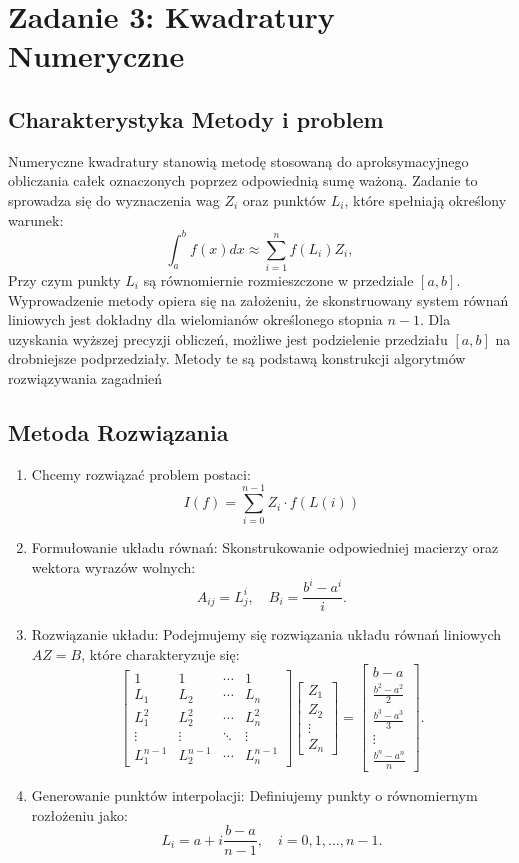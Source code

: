 \section{Zadanie 3: Kwadratury Numeryczne}
\subsection{Charakterystyka Metody i problem} 
Numeryczne kwadratury stanowią metodę stosowaną do aproksymacyjnego obliczania całek oznaczonych poprzez odpowiednią sumę ważoną. Zadanie to sprowadza się do wyznaczenia wag \( Z_i \) oraz punktów \( L_i \), które spełniają określony warunek:
\[
\int_a^b f(x)dx \approx \sum_{i=1}^n f(L_i)Z_i,
\]
Przy czym punkty \( L_i \) są równomiernie rozmieszczone w przedziale \([a, b]\). Wyprowadzenie metody opiera się na założeniu, że skonstruowany system równań liniowych jest dokładny dla wielomianów określonego stopnia \( n-1 \). Dla uzyskania wyższej precyzji obliczeń, możliwe jest podzielenie przedziału \([a, b]\) na drobniejsze podprzedziały. Metody te są podstawą konstrukcji algorytmów rozwiązywania zagadnień 

\subsection{Metoda Rozwiązania} 
\begin{enumerate}

\item Chcemy rozwiązać problem postaci:
\[
    I(f) = \sum_{i = 0}^{n-1} Z_i \cdot f(L(i))  
\]
\item Formułowanie układu równań: Skonstrukowanie odpowiedniej macierzy oraz wektora wyrazów wolnych: \[
A_{ij} = L_j^i, \quad B_i = \frac{b^i - a^i}{i}.
\]
\item Rozwiązanie układu: Podejmujemy się rozwiązania układu równań liniowych \( AZ = B \), które charakteryzuje się: \[
\begin{bmatrix}
1 & 1 & \cdots & 1 \\
L_1 & L_2 & \cdots & L_n \\
L_1^2 & L_2^2 & \cdots & L_n^2 \\
\vdots & \vdots & \ddots & \vdots \\
L_1^{n-1} & L_2^{n-1} & \cdots & L_n^{n-1}
\end{bmatrix}
\begin{bmatrix}
Z_1 \\
Z_2 \\
\vdots \\
Z_n
\end{bmatrix} =
\begin{bmatrix}
b-a \\
\frac{b^2-a^2}{2} \\
\frac{b^3-a^3}{3} \\
\vdots \\
\frac{b^n-a^n}{n}
\end{bmatrix}.
\]\noindent 
\item Generowanie punktów interpolacji: Definiujemy punkty o równomiernym rozłożeniu jako: 
\[
L_i = a + i \frac{b-a}{n-1}, \quad i=0,1,\ldots,n-1.
\]
\end{enumerate}
